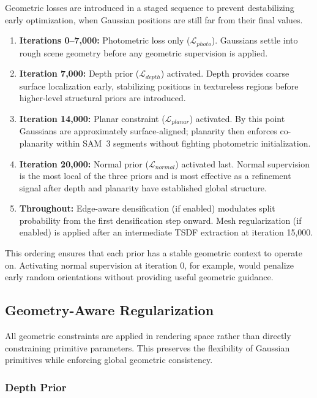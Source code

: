 Geometric losses are introduced in a staged sequence to prevent destabilizing early optimization, when Gaussian positions are still far from their final values.

\begin{enumerate}
    \item \textbf{Iterations 0--7{,}000:} Photometric loss only ($\mathcal{L}_{photo}$). Gaussians settle into rough scene geometry before any geometric supervision is applied.
    \item \textbf{Iteration 7{,}000:} Depth prior ($\mathcal{L}_{depth}$) activated. Depth provides coarse surface localization early, stabilizing positions in textureless regions before higher-level structural priors are introduced.
    \item \textbf{Iteration 14{,}000:} Planar constraint ($\mathcal{L}_{planar}$) activated. By this point Gaussians are approximately surface-aligned; planarity then enforces co-planarity within SAM~3 segments without fighting photometric initialization.
    \item \textbf{Iteration 20{,}000:} Normal prior ($\mathcal{L}_{normal}$) activated last. Normal supervision is the most local of the three priors and is most effective as a refinement signal after depth and planarity have established global structure.
    \item \textbf{Throughout:} Edge-aware densification (if enabled) modulates split probability from the first densification step onward. Mesh regularization (if enabled) is applied after an intermediate TSDF extraction at iteration 15{,}000.
\end{enumerate}

This ordering ensures that each prior has a stable geometric context to operate on. Activating normal supervision at iteration 0, for example, would penalize early random orientations without providing useful geometric guidance.

\subsection{Geometry-Aware Regularization}

All geometric constraints are applied in rendering space rather than directly constraining primitive parameters. This preserves the flexibility of Gaussian primitives while enforcing global geometric consistency.

\subsubsection{Depth Prior}
\label{sec:depth_prior}

